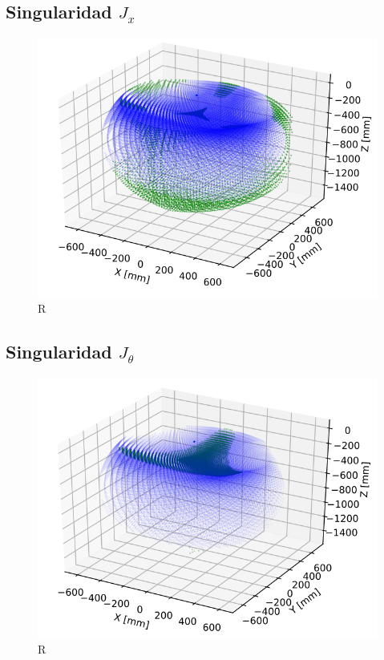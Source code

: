     \subsection{Singularidad $J_{x}$}
        \begin{figure}[h]
            \centering
            \includegraphics[width=0.65\linewidth]{Main/Chapter7/Images7/ws_4.png}
            \caption{R}
            \label{f:cap7_ws4}
        \end{figure}  
    
    \subsection{Singularidad $J_{\theta}$}
        \begin{figure}[h]
            \centering
            \includegraphics[width=0.65\linewidth]{Main/Chapter7/Images7/ws_5.png}
            \caption{R}
            \label{f:cap7_ws5}
        \end{figure}  
        
    \newpage
    
